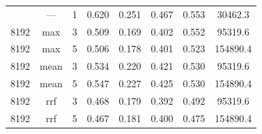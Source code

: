 {\begin{tabular}{cccccccc}
    \addlinespace[2pt]
    8192 & --- & 1 & 0.620 & 0.251 & 0.467 & 0.553 & 30462.3 \\
    8192 & max & 3 & 0.509 & 0.169 & 0.402 & 0.552 & 95319.6 \\
    8192 & max & 5 & 0.506 & 0.178 & 0.401 & 0.523 & 154890.4 \\
    8192 & mean & 3 & 0.534 & 0.220 & 0.421 & 0.530 & 95319.6 \\
    8192 & mean & 5 & 0.547 & 0.227 & 0.425 & 0.530 & 154890.4 \\
    8192 & rrf & 3 & 0.468 & 0.179 & 0.392 & 0.492 & 95319.6 \\
    8192 & rrf & 5 & 0.467 & 0.181 & 0.400 & 0.475 & 154890.4 \\
  \bottomrule
\end{tabular}%
}
